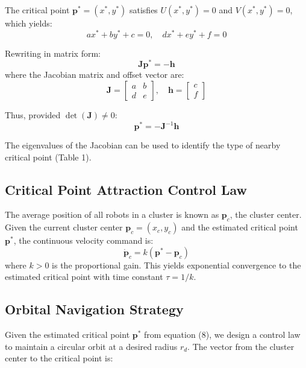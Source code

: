 \documentclass[lettersize,journal]{IEEEtran}
\begin{document}
The critical point $\mathbf{p}^* = (x^*, y^*)$ satisfies $U(x^*, y^*) = 0$ and $V(x^*, y^*) = 0$, which yields:
\begin{equation}
ax^* + by^* + c = 0, \quad dx^* + ey^* + f = 0
\end{equation}

Rewriting in matrix form:
\begin{equation}
\mathbf{J}\mathbf{p}^* = -\mathbf{h}
\end{equation}
where the Jacobian matrix and offset vector are:
\begin{equation}
\mathbf{J} = \begin{bmatrix} a & b \\ d & e \end{bmatrix}, \quad \mathbf{h} = \begin{bmatrix} c \\ f \end{bmatrix}
\end{equation}

Thus, provided $\det(\mathbf{J}) \neq 0$:
\begin{equation}
\mathbf{p}^* = -\mathbf{J}^{-1}\mathbf{h}
\end{equation}

The eigenvalues of the Jacobian can be used to identify the type of nearby critical point (Table 1).

\subsection{Critical Point Attraction Control Law}
The average position of all robots in a cluster is known as $\mathbf{p}_c$, the cluster center. Given the current cluster center $\mathbf{p}_c = (x_c, y_c)$ and the estimated critical point $\mathbf{p}^*$, the continuous velocity command is:
\begin{equation}
\dot{\mathbf{p}}_c = k(\mathbf{p}^* - \mathbf{p}_c)
\end{equation}
where $k > 0$ is the proportional gain. This yields exponential convergence to the estimated critical point with time constant $\tau = 1/k$.


\subsection{Orbital Navigation Strategy}

Given the estimated critical point $\mathbf{p}^*$ from equation (8), we design a control law to maintain a circular orbit at a desired radius $r_d$. The vector from the cluster center to the critical point is:
\end{document}
